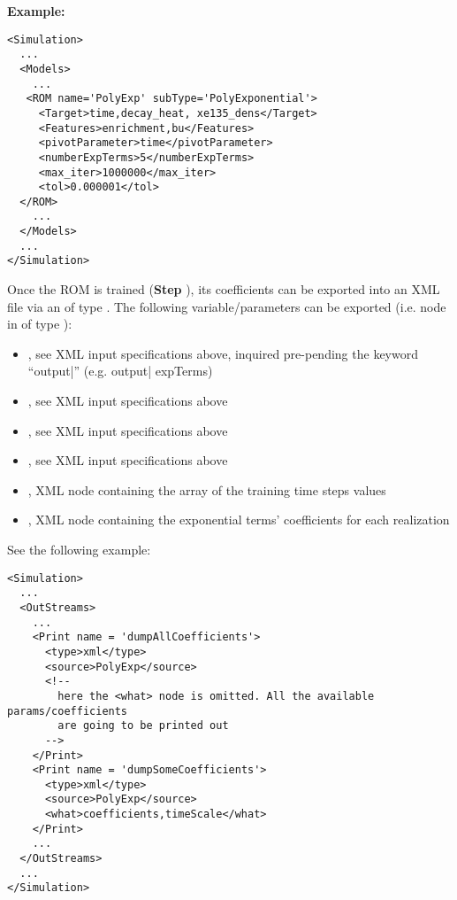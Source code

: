 \textbf{Example:}
\begin{lstlisting}[style=XML,morekeywords={name,subType}]
<Simulation>
  ...
  <Models>
    ...
   <ROM name='PolyExp' subType='PolyExponential'>
     <Target>time,decay_heat, xe135_dens</Target>
     <Features>enrichment,bu</Features>
     <pivotParameter>time</pivotParameter>
     <numberExpTerms>5</numberExpTerms>
     <max_iter>1000000</max_iter>
     <tol>0.000001</tol>
  </ROM>
    ...
  </Models>
  ...
</Simulation>
\end{lstlisting}
Once the ROM is trained (\textbf{Step} ), its coefficients can be exported into an XML file
via an  of type . The following variable/parameters can be exported (i.e.  node
in  of type ):
\begin{itemize}
  \item {}, see XML input specifications above, inquired pre-pending the keyword ``output|'' (e.g. output| expTerms)
  \item {}, see XML input specifications above
  \item {}, see XML input specifications above
  \item {}, see XML input specifications above
  \item {}, XML node containing the array of the training time steps values
  \item {}, XML node containing the exponential terms' coefficients for each realization
\end{itemize}


 See the following example:
\begin{lstlisting}[style=XML,morekeywords={name,subType}]
<Simulation>
  ...
  <OutStreams>
    ...
    <Print name = 'dumpAllCoefficients'>
      <type>xml</type>
      <source>PolyExp</source>
      <!--
        here the <what> node is omitted. All the available params/coefficients
        are going to be printed out
      -->
    </Print>
    <Print name = 'dumpSomeCoefficients'>
      <type>xml</type>
      <source>PolyExp</source>
      <what>coefficients,timeScale</what>
    </Print>
    ...
  </OutStreams>
  ...
</Simulation>
\end{lstlisting}


